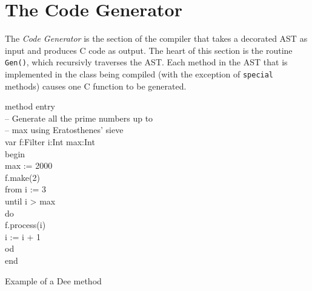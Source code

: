\section{The Code Generator}

The {\em Code Generator} is the section of the compiler that takes a
decorated AST as input and produces C code as output.  The heart of
this section is the routine {\tt Gen()}, which recursivly traverses the
AST.  Each method in the AST that is implemented in the class
being compiled (with the exception of {\tt special} methods) causes one
C function to be generated.

\begin{shortfigure}
\begin{prog}
\>	method entry                            \\
\>	-- Generate all the prime numbers up to \\
\>	-- max using Eratosthenes' sieve        \\
\>\>	  var f:Filter i:Int max:Int            \\
\>\>	  begin                                 \\
\>\>\>	    max := 2000                         \\
\>\>\>	    f.make(2)                           \\
\>\>\>	    from i := 3                         \\
\>\>\>	    until i > max                       \\
\>\>\>	    do                                  \\
\>\>\>\>	f.process(i)                    \\
\>\>\>\>        i := i + 1                      \\
\>\>\>      od                                  \\
\>\>	  end
\end{prog}
\caption{Example of a Dee method}
\label{fig:deemeth}
\end{shortfigure}


